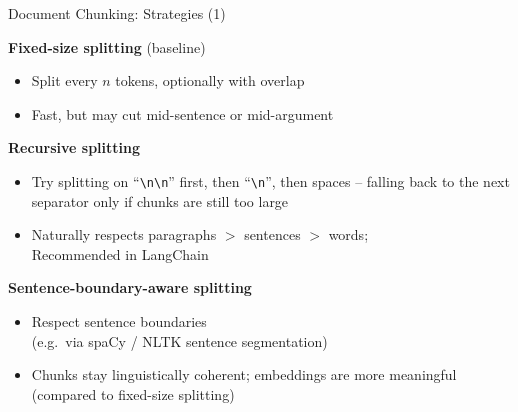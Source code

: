 \documentclass[11pt,compress,t,notes=noshow, xcolor=table]{beamer}
\begin{document}
\begin{frame}{Document Chunking: Strategies (1)}

\vspace{0.5em}

\textbf{Fixed-size splitting} (baseline)
\begin{itemize}
    \item Split every $n$ tokens, optionally with overlap
    \item Fast, but may cut mid-sentence or mid-argument
\end{itemize}

\vspace{1em}

\textbf{Recursive splitting} 
\begin{itemize}
    \item Try splitting on ``\texttt{\textbackslash n\textbackslash n}'' first, then ``\texttt{\textbackslash n}'', then spaces -- falling back to the next separator only if chunks are still too large
    \item Naturally respects paragraphs $>$ sentences $>$ words;\\
		Recommended in LangChain
\end{itemize}

\vspace{1em}

\textbf{Sentence-boundary-aware splitting}
\begin{itemize}
    \item Respect sentence boundaries\\(e.g.\ via spaCy / NLTK sentence segmentation)
    \item Chunks stay linguistically coherent; embeddings are more meaningful (compared to fixed-size splitting)
\end{itemize}

\end{frame}

\end{document}
